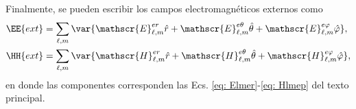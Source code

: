 Finalmente, se pueden escribir los campos electromagnéticos externos como 
\begin{align}
\EE{ext} &= \sum_{\ell,m}\var{\mathscr{E}_{\ell, m}^{er}\hat{r} + \mathscr{E}_{\ell, m}^{e\theta}\hat{\theta}+\mathscr{E}_{\ell, m}^{e\varphi}\hat{\varphi}},\\
\HH{ext} &= \sum_{\ell,m}\var{\mathscr{H}_{\ell, m}^{er}\hat{r} + \mathscr{H}_{\ell, m}^{e\theta}\hat{\theta}+\mathscr{H}_{\ell, m}^{e\varphi}\hat{\varphi}},
\end{align}
en donde las componentes corresponden las Ecs. \eqref{eq: Elmer}-\eqref{eq: Hlmep} del texto principal.
